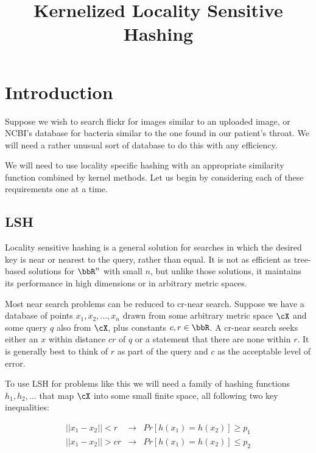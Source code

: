 \documentclass[twoside,11pt]{homework}
\title{Kernelized Locality Sensitive Hashing}
\begin{document}
\maketitle

\begin{abstract}
\end{abstract}


\section{Introduction}

Suppose we wish to search flickr for images similar to an uploaded image,
or NCBI's database for bacteria similar to the one found in our
patient's throat.  We will need a rather unusual sort of database to
do this with any efficiency.

We will need to use locality specific hashing with an appropriate
similarity function combined by kernel methods.  Let us begin by
considering each of these requirements one at a time.

\subsection{LSH} %

Locality sensitive hashing is a general solution for searches in which
the desired key is near or nearest to the query, rather than equal.
It is not as efficient as tree-based solutions for $\bbR^n$ with small
$n$, but unlike those solutions, it maintains its performance in high
dimensions or in arbitrary metric spaces.

Most near search problems can be reduced to cr-near search.  Suppose
we have a database of points $x_1,x_2,...,x_n$ drawn from some
arbitrary metric space $\cX$ and some query $q$ also from $\cX$, plus
constants $c,r\in\bbR$.  A cr-near search seeks either an $x$ within
distance $cr$ of $q$ or a statement that there are none within $r$.
It is generally best to think of $r$ as part of the query and $c$ as
the acceptable level of error.

To use LSH for problems like this we will need a family of hashing
functions $h_1,h_2,...$ that map $\cX$ into some small finite space,
all following two key inequalities:

\begin{eqnarray*}
  ||x_1-x_2|| < r & \rightarrow & Pr[h(x_1)=h(x_2)] \geq p_1 \\
  ||x_1-x_2|| > cr & \rightarrow & Pr[h(x_1)=h(x_2)] \leq p_2 \\
\end{eqnarray*}
\end{document}
